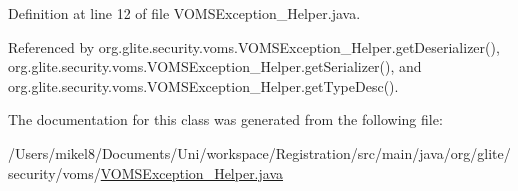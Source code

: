Definition at line 12 of file VOMSException\_\-Helper.java.



Referenced by org.glite.security.voms.VOMSException\_\-Helper.getDeserializer(), org.glite.security.voms.VOMSException\_\-Helper.getSerializer(), and org.glite.security.voms.VOMSException\_\-Helper.getTypeDesc().



The documentation for this class was generated from the following file:\begin{DoxyCompactItemize}
\item 
/Users/mikel8/Documents/Uni/workspace/Registration/src/main/java/org/glite/security/voms/\hyperlink{VOMSException__Helper_8java}{VOMSException\_\-Helper.java}\end{DoxyCompactItemize}
